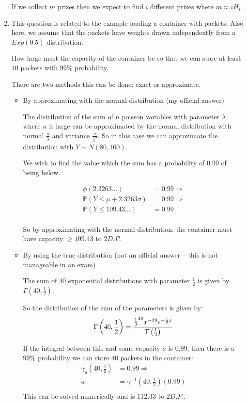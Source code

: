\documentclass[10pt,\jkfside,a4paper]{article}
\begin{document}
\begin{enumerate}
If we collect $m$ prizes then we expect to find $i$ different prizes where $m \approx iH_i$.

\item

This question is related to the example loading a container with packets.
Also here, we assume that the packets have weights drawn independently from
a $Exp(0.5)$ distribution.

How large must the capacity of the container be so that we can store at least 40
packets with 99\% probability.

There are two methods this can be done: exact or approximate.

\begin{itemize}

\item By approximating with the normal distribution (my official answer)

The distribution of the sum of $n$ poisson variables with parameter $\lambda$ where $n$ is large can be approximated
by the normal distribution with normal $\frac{n}{\lambda}$ and variance $\frac{n}{\lambda^2}$. So in this case we can
approximate the distribution with $Y \sim N(80, 160)$.

We wish to find the value which the sum has a probability of 0.99 of being below.

\[
\begin{split}
\phi(2.3263\dots) &= 0.99 \Longrightarrow \\
\mathbb{P}(Y \leq \mu + 2.3263 \sigma) &= 0.99 \Longrightarrow \\
\mathbb{P}(Y \leq 109.43\dots) &= 0.99 \\
\end{split}
\]

So by approximating with the normal distribution, the container must have capacity $\geq 109.43$ to $2 D.P$.

\item By using the true distribution (not an official answer -- this is not manageable in an exam)

The sum of $40$ exponential distributions with parameter $\frac{1}{2}$ is given by
$\Gamma\left( 40, \frac{1}{2} \right)$.

So the distribution of the sum of the parameters is given by:
\[
\Gamma\left( 40, \frac{1}{2} \right) = \frac{\frac{1}{2}^{40} x^{-39} e^{-\frac{1}{2} x}}{\Gamma\left(\frac{1}{2}\right)} \\
\]

If the integral between this and some capacity $a$ is 0.99, then there is a $99\%$ probability
we can store 40 packets in the container:
\[
\begin{split}
\gamma_a\left( 40, \frac{1}{2} \right) &= 0.99 \Longrightarrow \\
a &= \gamma^{-1}\left( 40, \frac{1}{2} \right)(0.99) \\
\end{split}
\]
This can be solved numerically and is $112.33$ to $2 D.P.$.

\end{itemize}

\end{enumerate}
\end{document}
